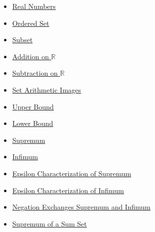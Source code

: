 \begin{dependencies}
\begin{itemize}
  \item \hyperref[def:reals]{Real Numbers}
  \item \hyperref[def:ordered-set]{Ordered Set}
  \item \hyperref[def:subset]{Subset}
  \item \hyperref[def:addition-on-r]{Addition on $\mathbb{R}$}
  \item \hyperref[def:subtraction-on-r]{Subtraction on $\mathbb{R}$}
  \item \hyperref[def:set-arithmetic-images]{Set Arithmetic Images}
  \item \hyperref[def:real-upper-bound]{Upper Bound}
  \item \hyperref[def:real-lower-bound]{Lower Bound}
  \item \hyperref[def:supremum]{Supremum}
  \item \hyperref[def:infimum]{Infimum}
  \item \hyperref[def:epsilon-characterization-of-supremum]{Epsilon Characterization of Supremum}
  \item \hyperref[def:epsilon-characterization-of-infimum]{Epsilon Characterization of Infimum}
  \item \hyperref[thm:negation-exchange-sup-inf]{Negation Exchanges Supremum and Infimum}
  \item \hyperref[thm:supremum-sum-set]{Supremum of a Sum Set}
\end{itemize}
\end{dependencies}

